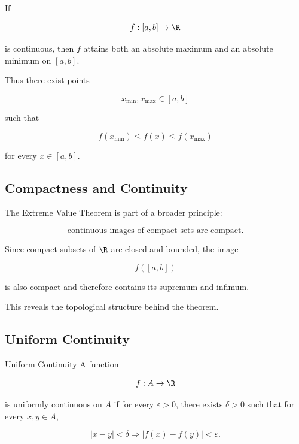 \begin{theorem}
If

\[
f:[a,b]\to\R
\]

is continuous, then \(f\) attains both an absolute maximum and an absolute
minimum on \([a,b]\).
\end{theorem}

Thus there exist points

\[
x_{\min},x_{\max}\in[a,b]
\]

such that

\[
\boxed{
f(x_{\min})
\leq
f(x)
\leq
f(x_{\max})
}
\]

for every \(x\in[a,b]\).

\subsection{Compactness and Continuity}
\label{subsec:compactness-continuity-analysis}

The Extreme Value Theorem is part of a broader principle:

\[
\boxed{
\text{continuous images of compact sets are compact}.
}
\]

Since compact subsets of \(\R\) are closed and bounded, the image

\[
f([a,b])
\]

is also compact and therefore contains its supremum and infimum.

This reveals the topological structure behind the theorem.

\subsection{Uniform Continuity}
\label{subsec:uniform-continuity}

\begin{definitionbox}{Uniform Continuity}
A function

\[
f:A\to\R
\]

is uniformly continuous on \(A\) if for every \(\varepsilon>0\), there
exists \(\delta>0\) such that for every \(x,y\in A\),

\[
\boxed{
|x-y|<\delta
\Longrightarrow
|f(x)-f(y)|<\varepsilon.
}
\]
\end{definitionbox}

